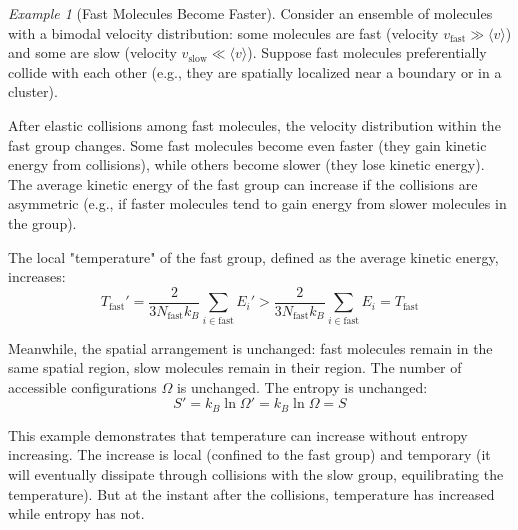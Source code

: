 \documentclass[12pt,a4paper]{article}
\theoremstyle{definition}
\theoremstyle{remark}
\newtheorem{example}[theorem]{Example}
\begin{document}
\begin{example}[Fast Molecules Become Faster]
\label{ex:fast_faster}
Consider an ensemble of molecules with a bimodal velocity distribution: some molecules are fast (velocity $v_{\text{fast}} \gg \langle v \rangle$) and some are slow (velocity $v_{\text{slow}} \ll \langle v \rangle$). Suppose fast molecules preferentially collide with each other (e.g., they are spatially localized near a boundary or in a cluster).

After elastic collisions among fast molecules, the velocity distribution within the fast group changes. Some fast molecules become even faster (they gain kinetic energy from collisions), while others become slower (they lose kinetic energy). The average kinetic energy of the fast group can increase if the collisions are asymmetric (e.g., if faster molecules tend to gain energy from slower molecules in the group).

The local "temperature" of the fast group, defined as the average kinetic energy, increases:
\begin{equation}
T_{\text{fast}}' = \frac{2}{3 N_{\text{fast}} k_B} \sum_{i \in \text{fast}} E_i' > \frac{2}{3 N_{\text{fast}} k_B} \sum_{i \in \text{fast}} E_i = T_{\text{fast}}
\end{equation}

Meanwhile, the spatial arrangement is unchanged: fast molecules remain in the same spatial region, slow molecules remain in their region. The number of accessible configurations $\Omega$ is unchanged. The entropy is unchanged:
\begin{equation}
S' = k_B \ln \Omega' = k_B \ln \Omega = S
\end{equation}

This example demonstrates that temperature can increase without entropy increasing. The increase is local (confined to the fast group) and temporary (it will eventually dissipate through collisions with the slow group, equilibrating the temperature). But at the instant after the collisions, temperature has increased while entropy has not.
\end{example}
\end{document}
